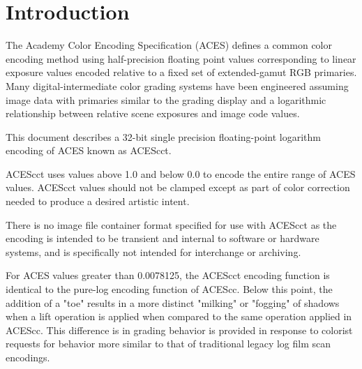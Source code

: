 \unnumberedformat	    %
\chapter{Introduction} 	%

The Academy Color Encoding Specification (ACES) defines a common color encoding method using half-precision floating point values corresponding to linear exposure values encoded relative to a fixed set of extended-gamut RGB primaries. Many digital-intermediate color grading systems have been engineered assuming image data with primaries similar to the grading display and a logarithmic relationship between relative scene exposures and image code values.

This document describes a 32-bit single precision floating-point logarithm encoding of ACES known as ACEScct.

ACEScct uses values above 1.0 and below 0.0 to encode the entire range of ACES values. ACEScct values should not be clamped except as part of color correction needed to produce a desired artistic intent.

There is no image file container format specified for use with ACEScct as the encoding is intended to be transient and internal to software or hardware systems, and is specifically not intended for interchange or archiving.

For ACES values greater than 0.0078125, the ACEScct encoding function is identical to the pure-log encoding function of ACEScc. Below this point, the addition of a "toe" results in a more distinct "milking" or "fogging" of shadows when a lift operation is applied when compared to the same operation applied in ACEScc. This difference is in grading behavior is provided in response to colorist requests for behavior more similar to that of traditional legacy log film scan encodings. 